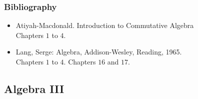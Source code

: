 \documentclass[spanish]{article}
\begin{document}
\subsubsection{Bibliography}
\begin{itemize}
  \item
Atiyah-Macdonald. Introduction to Commutative Algebra\\
Chapters $1$ to $4$.

  \item
Lang, Serge: Algebra, Addison-Wesley, Reading, 1965.\\
Chapters $1$ to $4$. Chapters $16$ and $17$.
\end{itemize}


\hrulefill%

\subsection{Algebra III}
\end{document}
